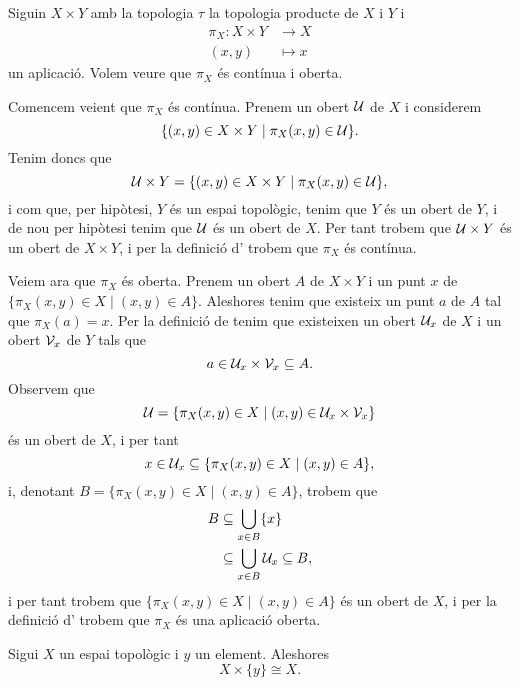 \documentclass[../../Main.tex]{subfiles}
\begin{document}
	\begin{example}[Projeccions]
		\label{ex:les projeccions en la topologia producte són contínues i obertes}
		Siguin \(X\times Y\) amb la topologia \(\tau\) la topologia producte de \(X\) i \(Y\) i
		\begin{align*}
			\pi_{X}\colon X\times Y&\longrightarrow X \\
			(x,y)&\longmapsto x
		\end{align*}
		un aplicació. Volem veure que \(\pi_{X}\) és contínua i oberta.
		\begin{solution}
			Comencem veient que \(\pi_{X}\) és contínua. Prenem un obert \(\mathcal{U}\) de \(X\) i considerem
			\[
			    \{(x,y)\in X\times Y\mid \pi_{X}(x,y)\in\mathcal{U}\}.
			\]
			Tenim doncs que
			\[
			    \mathcal{U}\times Y=\{(x,y)\in X\times Y\mid \pi_{X}(x,y)\in\mathcal{U}\},
			\]
			i com que, per hipòtesi, \(Y\) és un espai topològic, tenim que \(Y\) és un obert de \(Y\), i de nou per hipòtesi tenim que \(\mathcal{U}\) és un obert de \(X\). Per tant trobem que \(\mathcal{U}\times Y\) és un obert de \(X\times Y\), i per la definició d' trobem que \(\pi_{X}\) és contínua.
			
			Veiem ara que \(\pi_{X}\) és oberta. Prenem un obert \(A\) de \(X\times Y\) i un punt \(x\) de \(\{\pi_{X}(x,y)\in X\mid(x,y)\in A\}\). Aleshores tenim que existeix un punt \(a\) de \(A\) tal que \(\pi_{X}(a)=x\). Per la definició de  tenim que existeixen un obert \(\mathcal{U}_{x}\) de \(X\) i un obert \(\mathcal{V}_{x}\) de \(Y\) tals que
			\[
			    a\in\mathcal{U}_{x}\times\mathcal{V}_{x}\subseteq A.
			\]
			Observem que
			\[
			    \mathcal{U}=\{\pi_{X}(x,y)\in X\mid(x,y)\in\mathcal{U}_{x}\times\mathcal{V}_{x}\}
			\]
			és un obert de \(X\), i per tant
			\[
			    x\in\mathcal{U}_{x}\subseteq\{\pi_{X}(x,y)\in X\mid(x,y)\in A\},
			\]
			i, denotant \(B=\{\pi_{X}(x,y)\in X\mid(x,y)\in A\}\), trobem que
			\begin{align*}
				B&\subseteq\bigcup_{x\in B}\{x\} \\
				&\subseteq\bigcup_{x\in B}\mathcal{U}_{x}\subseteq B,
			\end{align*}
			i per tant trobem que \(\{\pi_{X}(x,y)\in X\mid(x,y)\in A\}\) és un obert de \(X\), i per la definició d' trobem que \(\pi_{X}\) és una aplicació oberta. %
		\end{solution}
	\end{example}
	\begin{corollary} %
		\label{cor:un espai topològic producte amb un element és homeomorf a l'espai topològic}
		Sigui \(X\) un espai topològic i \(y\) un element. Aleshores
		\[
		    X\times\{y\}\cong X.
		\]
	\end{corollary}
\end{document}
